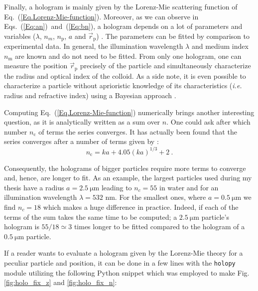 Finally, a hologram is mainly given by the Lorenz-Mie scattering function of Eq.~(\ref{Eq.Lorenz-Mie-function}). Moreover, as we can observe in Eqs.~(\ref{Eq:an})~and~(\ref{Eq:bn}), a hologram depends on a lot of parameters and variables ($\lambda$, $n_m$, $n_\mathrm{p}$, $a$ and $\vec{r}_\mathrm{p}$) . The parameters can be fitted by comparison to experimental data. In general, the illumination wavelength $\lambda$ and medium index $n_\mathrm{m}$ are known and do not need to be fitted. From only one hologram, one can measure  the position $\vec{r}_\mathrm{p}$ precisely of the particle and simultaneously characterize the radius and optical index of the colloid. As a side note, it is even possible to characterize a particle without aprioristic knowledge of its characteristics (\textit{i.e.} radius and refractive index) using a Bayesian approach \cite{gregory_bayesian_2005, dimiduk_bayesian_2016}.

Computing Eq.~(\ref{Eq.Lorenz-Mie-function}) numerically brings another interesting question, as it is analytically written as a sum over $n$. One could ask after which number $n_\mathrm{c}$ of terms the series converges. It has actually been found that the series converges after a number of terms given by \cite{wiscombe_improved_1980}:
\begin{equation}
	n_\mathrm{c} = k a + 4.05 (k a)^{1/3} + 2 ~.
\end{equation}

Consequently, the holograms of bigger particles require more terms to converge and, hence, are longer to fit. As an example, the largest particles used during my thesis have a radius $a = 2.5 ~ \mathrm{\mu m}$ leading to $ n_c = 55$ in water and for an illumination wavelength $\lambda = 532$ nm. For the smallest ones, where $a = 0.5 ~ \mathrm{\mu m}$ we find $n_c = 18$ which makes a huge difference in practice. Indeed, if each of the terms of the sum takes the same time to be computed; a $2.5 ~ \mathrm{\mu m}$ particle's hologram is $55/18 \simeq 3$ times longer to be fitted compared to the hologram of a $0.5 ~ \mathrm{\mu m}$ particle.

If a reader wants to evaluate a hologram given by the Lorenz-Mie theory for a peculiar particle and position, it can be done in a few lines with the \texttt{holopy} module utilizing the following Python snippet which was employed to make Fig.\ref{fig:holo_fix_z} and \ref{fig:holo_fix_n}:

